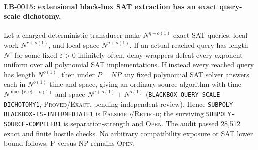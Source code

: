 \paragraph{LB-0015: extensional black-box SAT extraction has an exact query-scale dichotomy.}
Let a charged deterministic transducer make $N^{\eta+o(1)}$ exact SAT
queries, local work $N^{r+o(1)}$, and local space $N^{p+o(1)}$.  If an
actual reached query has length $N^\varepsilon$ for some fixed
$\varepsilon>0$ infinitely often, delay wrappers defeat every exponent
uniform over all polynomial SAT implementations.  If instead every reached
query has length $N^{o(1)}$, then under $P=NP$ any fixed polynomial SAT solver
answers each in $N^{o(1)}$ time and space, giving an ordinary source
algorithm with time $N^{\max\{r,\eta\}+o(1)}$ and space
$N^{p+o(1)}+N^{o(1)}$ (\texttt{BLACKBOX-QUERY-SCALE-DICHOTOMY1},
\textsc{Proved/Exact}, pending independent review).  Hence
\texttt{SUBPOLY-BLACKBOX-IS-INTERMEDIATE1} is
\textsc{Falsified/Retired}; the surviving
\texttt{SUBPOLY-SOURCE-COMPILER1} is separation-strength and \textsc{Open}.
The audit passed 28,512 exact and finite hostile checks.  No arbitrary
compatibility exposure or SAT lower bound follows.  P versus NP remains
\textsc{Open}.
